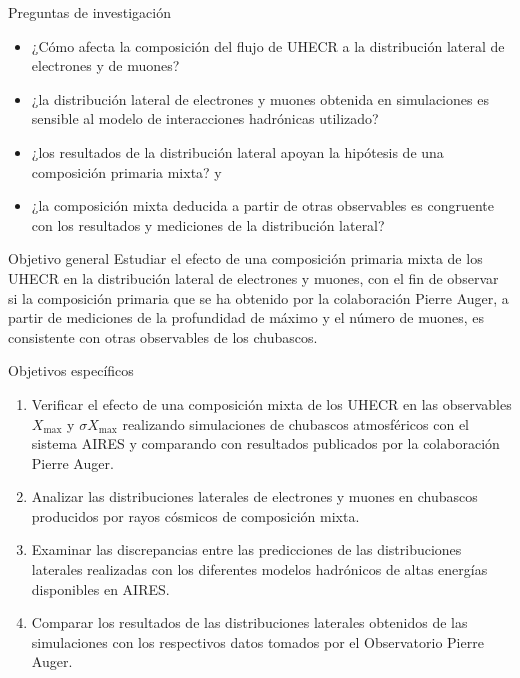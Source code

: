 \documentclass[10pt]{beamer}
\begin{document}
\begin{frame}{Preguntas de investigación}
\begin{itemize}
\item ¿Cómo afecta la composición del flujo de UHECR a la distribución lateral de electrones y de muones? \vspace{0.3 cm}
\item ¿la distribución lateral de electrones y muones obtenida en simulaciones es sensible al modelo de interacciones hadrónicas utilizado? \vspace{0.3 cm}
\item ¿los resultados de la distribución lateral apoyan la hipótesis de una composición primaria mixta? y \vspace{0.3 cm}
\item ¿la composición mixta deducida a partir de otras observables es congruente con los resultados y mediciones de la distribución lateral?
\end{itemize}
\end{frame}

\begin{frame}{Objetivo general}
Estudiar el efecto de una composición primaria mixta de los UHECR en la distribución lateral de electrones y muones, con el fin de observar si la composición primaria que se ha obtenido por la colaboración Pierre Auger, a partir de mediciones de la profundidad de máximo y el número de muones, es consistente con otras observables de los chubascos.
\end{frame}

\begin{frame}{Objetivos específicos}

\begin{enumerate}
\item Verificar el efecto de una composición mixta de los UHECR en las observables $X_{\text{max}}$ y $\sigma X_{\text{max}}$ realizando simulaciones de chubascos atmosféricos con el sistema AIRES y comparando con resultados publicados por la colaboración Pierre Auger.\vspace{0.3 cm}
	
	\item Analizar las distribuciones laterales de electrones y muones en chubascos producidos por rayos cósmicos de composición mixta. \vspace{0.3 cm}
	
	\item Examinar las discrepancias entre las predicciones de las distribuciones laterales realizadas con los diferentes modelos hadrónicos de altas energías disponibles en AIRES. \vspace{0.3 cm}
	
	\item Comparar los resultados de las distribuciones laterales obtenidos de las simulaciones con los respectivos datos tomados por el Observatorio Pierre Auger. \vspace{0.3 cm}
\end{enumerate}
\end{frame}
\end{document}
